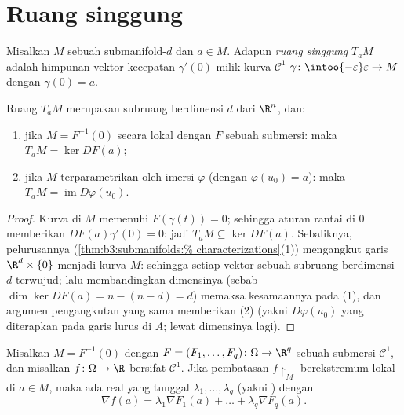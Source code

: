 \section{Ruang singgung}

\begin{definition}\label{def:b3:submanifolds:tangent}
Misalkan $M$ sebuah submanifold-$d$ dan $a \in M$. Adapun \emph{ruang
singgung} $T_aM$ adalah himpunan vektor
kecepatan $\gamma'(0)$ milik kurva $\mathcal C^1$ $\gamma \colon
\intoo{-\varepsilon}\varepsilon \to M$ dengan $\gamma(0) = a$.
\end{definition}

\begin{proposition}\label{prop:b3:submanifolds:tangent}
Ruang $T_aM$ merupakan subruang berdimensi $d$ dari $\R^n$, dan:
\begin{enumerate}
  \item jika $M = F^{-1}(0)$ secara lokal dengan $F$ sebuah submersi:
        maka $T_aM = \ker DF(a)$;
  \item jika $M$ terparametrikan oleh imersi $\varphi$
        (dengan $\varphi(u_0) = a$): maka $T_aM =
        \operatorname{im}D\varphi(u_0)$.
\end{enumerate}
\end{proposition}

\begin{proof}
Kurva di $M$ memenuhi $F(\gamma(t)) = 0$; sehingga aturan rantai di
$0$ memberikan $DF(a)\gamma'(0) = 0$: jadi $T_aM \subseteq \ker DF(a)$.
Sebaliknya, pelurusannya (\cref{thm:b3:submanifolds:%
characterizations}(1)) mengangkut garis
$\R^d\times\{0\}$ menjadi kurva $M$: sehingga setiap vektor sebuah
subruang berdimensi $d$ terwujud; lalu membandingkan dimensinya
(sebab $\dim\ker DF(a) = n - (n - d) = d$) memaksa kesamaannya pada (1),
dan argumen pengangkutan yang sama memberikan (2) (yakni $D\varphi(u_0)$
yang diterapkan pada garis lurus di $A$; lewat dimensinya lagi).
\end{proof}

\begin{theorem}
\label{thm:b3:submanifolds:lagrange}
Misalkan $M = F^{-1}(0)$ dengan $F = (F_1, \dots, F_q) \colon \Omega
\to \R^q$ sebuah submersi $\mathcal C^1$, dan misalkan $f \colon
\Omega \to \R$ bersifat $\mathcal C^1$. Jika pembatasan
$f\restriction_M$ berekstremum lokal di $a \in M$, maka
ada real yang tunggal $\lambda_1, \dots, \lambda_q$
(yakni \emph{}) dengan
\[
\nabla f(a) = \lambda_1\nabla F_1(a) + \dots +
\lambda_q\nabla F_q(a) .
\]
\end{theorem}


